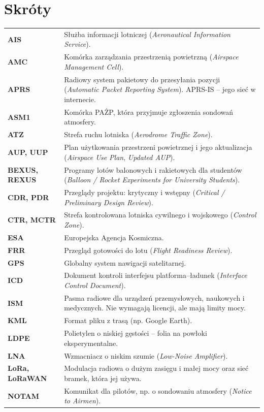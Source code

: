\section*{Skróty}
\noindent\begin{tabularx}{\linewidth}{@{}>{\bfseries}P{20mm}L@{}}
\toprule
AIS & Służba informacji lotniczej (\emph{Aeronautical Information Service}).\\
AMC & Komórka zarządzania przestrzenią powietrzną (\emph{Airspace Management Cell}).\\
APRS & Radiowy system pakietowy do przesyłania pozycji (\emph{Automatic Packet Reporting System}). APRS-IS -- jego sieć w internecie.\\
ASM1 & Komórka PAŻP, która przyjmuje zgłoszenia sondowań atmosfery.\\
ATZ & Strefa ruchu lotniska (\emph{Aerodrome Traffic Zone}).\\
AUP, UUP & Plan użytkowania przestrzeni powietrznej i jego aktualizacja (\emph{Airspace Use Plan}, \emph{Updated AUP}).\\
BEXUS, REXUS & Programy lotów balonowych i rakietowych dla studentów (\emph{Balloon / Rocket Experiments for University Students}).\\
CDR, PDR & Przeglądy projektu: krytyczny i wstępny (\emph{Critical / Preliminary Design Review}).\\
CTR, MCTR & Strefa kontrolowana lotniska cywilnego i wojskowego (\emph{Control Zone}).\\
ESA & Europejska Agencja Kosmiczna.\\
FRR & Przegląd gotowości do lotu (\emph{Flight Readiness Review}).\\
GPS & Globalny system nawigacji satelitarnej.\\
ICD & Dokument kontroli interfejsu platforma--ładunek (\emph{Interface Control Document}).\\
ISM & Pasma radiowe dla urządzeń przemysłowych, naukowych i medycznych. Nie wymagają licencji, ale mają limity mocy.\\
KML & Format pliku z trasą (np. Google Earth).\\
LDPE & Polietylen o niskiej gęstości -- folia na powłoki eksperymentalne.\\
LNA & Wzmacniacz o niskim szumie (\emph{Low-Noise Amplifier}).\\
LoRa, LoRaWAN & Modulacja radiowa o dużym zasięgu i małej mocy oraz sieć bramek, która jej używa.\\
NOTAM & Komunikat dla pilotów, np. o sondowaniu atmosfery (\emph{Notice to Airmen}).\\

\end{tabularx}
